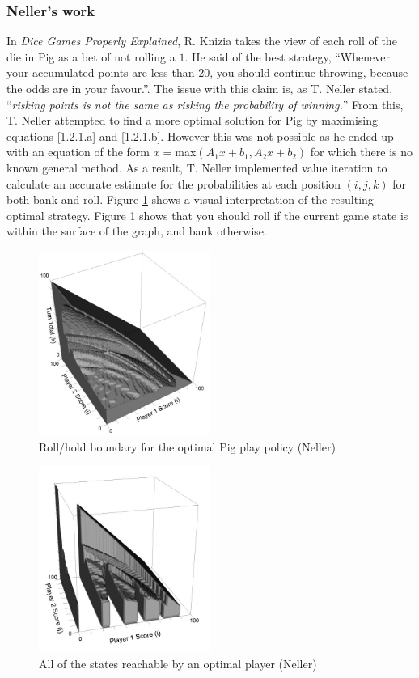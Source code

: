 \documentclass[a4paper,titlepage]{article}
\begin{document}
\subsubsection{Neller's work}
In \textit{Dice Games Properly Explained}, R. Knizia takes the view of each roll of the die in Pig as a bet of not rolling a $1$. He said of the best strategy, ``Whenever your accumulated points are less than 20, you should continue throwing, because the odds are in your favour.''\cite{knizia2010dice}. The issue with this claim is, as T. Neller stated, ``\textit{risking points is not the same as risking the probability of winning.}''\cite{neller2004optimal} From this, T. Neller attempted to find a more optimal solution for Pig by maximising equations \ref{1.2.1.a} and \ref{1.2.1.b}. However this was not possible as he ended up with an equation of the form $x=$max$ (A_1 x+b_1,A_2 x+b_2)$ for which there is no known general method. As a result, T. Neller implemented value iteration to calculate an accurate estimate for the probabilities at each position $(i,j,k)$ for both bank and roll. Figure \ref{figure1} shows a visual interpretation of the resulting optimal strategy. Figure 1 shows that you should roll if the current game state is within the surface of the graph, and bank otherwise.

\begin{figure}
\centering
\includegraphics[width=0.5\textwidth]{neller_optimal_solution}
\caption{Roll\slash hold boundary for the optimal Pig play policy (Neller)\label{figure1}}
\end{figure}
\begin{figure}
\centering
\includegraphics[width=0.5\textwidth]{neller_optimal_solution_2}
\caption{All of the states reachable by an optimal player (Neller)\label{figure2}}
\end{figure}
\end{document}
